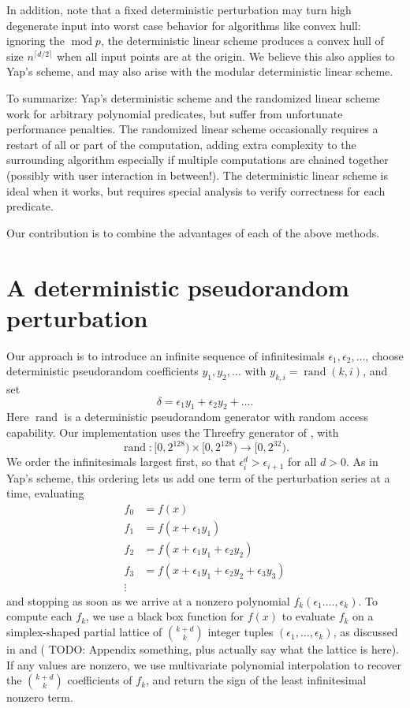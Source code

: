 \documentclass[11pt]{article}
\newcommand{\rand}{\operatorname{rand}}
\newcommand{\TODO}{{\color{red} TODO}}
\begin{document}
In addition, \cite{burnikel1994degeneracy} note that a fixed deterministic perturbation may turn high degenerate input into worst case behavior for algorithms
like convex hull: ignoring the $\operatorname{mod} p$, the deterministic linear scheme produces a convex hull of size $n^{\lceil d/2 \rceil}$ when all input
points are at the origin.  We believe this also applies to Yap's scheme, and may also arise with the modular deterministic linear scheme.

To summarize: Yap's deterministic scheme and the randomized linear scheme work for arbitrary polynomial predicates, but suffer from unfortunate performance penalties.
The randomized linear scheme occasionally requires a restart of all or part of the computation, adding extra complexity to the surrounding algorithm
especially if multiple computations are chained together (possibly with user interaction in between!).  The deterministic linear scheme is ideal when it works,
but requires special analysis to verify correctness for each predicate.

Our contribution is to combine the advantages of each of the above methods.

\section{A deterministic pseudorandom perturbation}

Our approach is to introduce an infinite sequence of infinitesimals $\epsilon_1, \epsilon_2, \ldots$, choose deterministic pseudorandom coefficients $y_1, y_2, \ldots$
with $y_{k,i} = \rand(k,i)$, and set
$$\delta = \epsilon_1 y_1 + \epsilon_2 y_2 + \ldots.$$
Here $\rand$ is a deterministic pseudorandom generator with random access capability.  Our implementation uses the Threefry generator of
\cite{salmon2011random}, with
$$\rand : [0,2^{128}) \times [0,2^{128}) \to [0,2^{32}).$$
We order the infinitesimals largest first, so that $\epsilon_i^d > \epsilon_{i+1}$ for all $d > 0$.  As in Yap's scheme, this ordering lets us add one term of the
perturbation series at a time, evaluating
\begin{align*}
f_0 &= f(x) \\
f_1 &= f(x + \epsilon_1 y_1) \\
f_2 &= f(x + \epsilon_1 y_1 + \epsilon_2 y_2) \\
f_3 &= f(x + \epsilon_1 y_1 + \epsilon_2 y_2 + \epsilon_3 y_3) \\
\vdots
\end{align*}
and stopping as soon as we arrive at a nonzero polynomial $f_k(\epsilon_1. \ldots, \epsilon_k)$.
To compute each $f_k$, we use a black box function for $f(x)$ to evaluate $f_k$ on a simplex-shaped partial lattice of $\binom{k+d}{k}$ integer tuples
$(\epsilon_1, \ldots, \epsilon_k)$, as discussed in \cite{neidinger2009multivariable} and (\TODO: Appendix something, plus actually say what the lattice is here).  If any values are nonzero, we use multivariate
polynomial interpolation to recover the $\binom{k+d}{k}$ coefficients of $f_k$, and return the sign of the least infinitesimal nonzero term.
\end{document}

